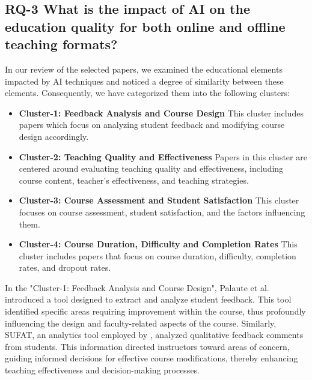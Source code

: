 \documentclass{svproc}
\begin{document}
\subsection{\textbf{RQ-3 What is the impact of AI on the education quality for both online and offline teaching formats?}}
 \label{RQ3_analysis}

In our review of the selected papers, we examined the educational elements impacted by AI techniques and noticed a degree of similarity between these elements. Consequently, we have categorized them into the following clusters:

\begin{itemize}
\item \textbf{Cluster-1: Feedback Analysis and Course Design}
This cluster includes papers which focus on analyzing student feedback and modifying course design accordingly.

\item \textbf{Cluster-2: Teaching Quality and Effectiveness}
Papers in this cluster are centered around evaluating teaching quality and effectiveness, including course content, teacher's effectiveness, and teaching strategies.

\item \textbf{Cluster-3: Course Assessment and Student Satisfaction}
This cluster focuses on course assessment, student satisfaction, and the factors influencing them.

\item \textbf{Cluster-4: Course Duration, Difficulty and Completion Rates}
This cluster includes papers that focus on course duration, difficulty, completion rates, and dropout rates.
\end{itemize}

In the "Cluster-1: Feedback Analysis and Course Design", Palaute et al. \cite{Palaute:_An_Online_Text_Mining_Tool_for_Analyzing_Written_Student_Course_Feedback} introduced a tool designed to extract and analyze student feedback. This tool identified specific areas requiring improvement within the course, thus profoundly influencing the design and faculty-related aspects of the course. Similarly, SUFAT, an analytics tool employed by \cite{SUFAT_An_Analytics_Tool_for_Gaining_Insights_from_Student_Feedback_Comments}, analyzed qualitative feedback comments from students. This information directed instructors toward areas of concern, guiding informed decisions for effective course modifications, thereby enhancing teaching effectiveness and decision-making processes.
\end{document}
